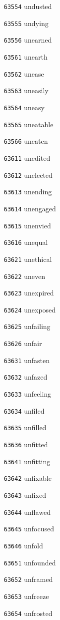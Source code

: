 \documentclass[twoside,11pt]{article}
\begin{document}
\begin{multicols}{5}
\begin{enumerate}
\item[\texttt{63554}] undusted
\item[\texttt{63555}] undying
\item[\texttt{63556}] unearned
\item[\texttt{63561}] unearth
\item[\texttt{63562}] unease
\item[\texttt{63563}] uneasily
\item[\texttt{63564}] uneasy
\item[\texttt{63565}] uneatable
\item[\texttt{63566}] uneaten
\item[\texttt{63611}] unedited
\item[\texttt{63612}] unelected
\item[\texttt{63613}] unending
\item[\texttt{63614}] unengaged
\item[\texttt{63615}] unenvied
\item[\texttt{63616}] unequal
\item[\texttt{63621}] unethical
\item[\texttt{63622}] uneven
\item[\texttt{63623}] unexpired
\item[\texttt{63624}] unexposed
\item[\texttt{63625}] unfailing
\item[\texttt{63626}] unfair
\item[\texttt{63631}] unfasten
\item[\texttt{63632}] unfazed
\item[\texttt{63633}] unfeeling
\item[\texttt{63634}] unfiled
\item[\texttt{63635}] unfilled
\item[\texttt{63636}] unfitted
\item[\texttt{63641}] unfitting
\item[\texttt{63642}] unfixable
\item[\texttt{63643}] unfixed
\item[\texttt{63644}] unflawed
\item[\texttt{63645}] unfocused
\item[\texttt{63646}] unfold
\item[\texttt{63651}] unfounded
\item[\texttt{63652}] unframed
\item[\texttt{63653}] unfreeze
\item[\texttt{63654}] unfrosted

\end{enumerate}
\end{multicols}
\end{document}
